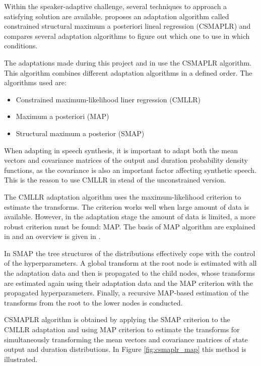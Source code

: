 Within the speaker-adaptive challenge, several techniques to approach a satisfying solution are available. 
%
\cite{yamagishi2009} proposes an adaptation algorithm called constrained structural maximum a posteriori lineal regression (CSMAPLR) and compares several adaptation algorithms to figure out which one to use in which conditions.

The adaptations made during this project and in \cite{karhila_jstsp_14} use the CSMAPLR algorithm.
%
This algorithm combines different adaptation algorithms in a defined order. The algorithms used are:

\begin{itemize}
	\item Constrained maximum-likelihood liner regression (CMLLR)
	\item Maximum a posteriori (MAP)
	\item Structural maximum a posterior (SMAP)
\end{itemize}

When adapting in speech synthesis, it is important to adapt both the mean vectors and covariance matrices of the output and duration probability density functions, as the covariance is also an important factor affecting synthetic speech.
%
This is the reason to use CMLLR in stead of the unconstrained version.

The CMLLR adaptation algorithm uses the maximum-likelihood criterion \cite{digalakis1995speaker, gales1998maximum} to estimate the transforms. 
%
The criterion works well when large amount of data is available.
%
However, in the adaptation stage the amount of data is limited, a more robust criterion must be found: MAP.
%
The basis of MAP algorithm are explained in \cite{gauvain1994maximum} and an overview is given in \cite{yamagishi2009}.

In SMAP \cite{shinoda2001structural} the tree structures of the distributions effectively cope with the control of the hyperparameters.
%
A global transform at the root node is estimated with all the adaptation data and then is propagated to the child nodes, whose transforms are estimated again using their adaptation data and the MAP criterion with the propagated hyperparameters.
%
Finally, a recursive MAP-based estimation of the transforms from the root to the lower nodes is conducted.

CSMAPLR algorithm is obtained by applying the SMAP criterion to the CMLLR adaptation and using MAP criterion to estimate the transforms for simultaneously transforming the mean vectors and covariance matrices of state output and duration distributions.
%
In Figure \ref{fig:csmaplr_map} this method is illustrated.

